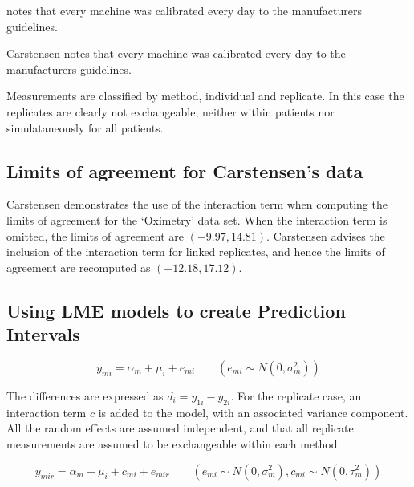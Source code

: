 \documentclass[12pt, a4paper]{report}
\theoremstyle{plain}
\theoremstyle{definition}
\theoremstyle{remark}
\begin{document}
	\citet{BXC2008} notes that every machine was calibrated every day to  the manufacturers guidelines.
	
	Carstensen notes that every machine was calibrated every day to  the manufacturers guidelines.
	
	Measurements are classified by method, individual and replicate. In this case the replicates are clearly not exchangeable, neither within patients nor simulataneously for all patients.
	
	
	\subsection{Limits of agreement for Carstensen's data}
	
	
	Carstensen demonstrates the use of the interaction term when computing the limits of agreement for the `Oximetry' data set. When the interaction term is omitted, the limits of agreement are $(-9.97, 14.81)$. Carstensen advises the inclusion of the interaction term for linked replicates, and hence the limits of agreement are recomputed as $(-12.18,17.12)$.
	
	
	\subsection{Using LME models to create Prediction Intervals}
	
	
	
	\begin{equation}
	y_{mi}  = \alpha_{m} + \mu_{i} + e_{mi} \qquad ( e_{mi} \sim
	N(0,\sigma^{2}_{m}))
	\end{equation}
	
	
	
	
	
	The differences are expressed as $d_{i} = y_{1i} - y_{2i}$.
	For the
	replicate case, an interaction term $c$ is added to the model,
	with an associated variance component. 
	All the random effects are
	assumed independent, and that all replicate measurements are
	assumed to be exchangeable within each method.
	
	
	
	\begin{equation}
	y_{mir}  = \alpha_{m} + \mu_{i} + c_{mi} + e_{mir} \qquad ( e_{mi}
	\sim N(0,\sigma^{2}_{m}), c_{mi} \sim N(0,\tau^{2}_{m}))
	\end{equation}
	
\end{document}
